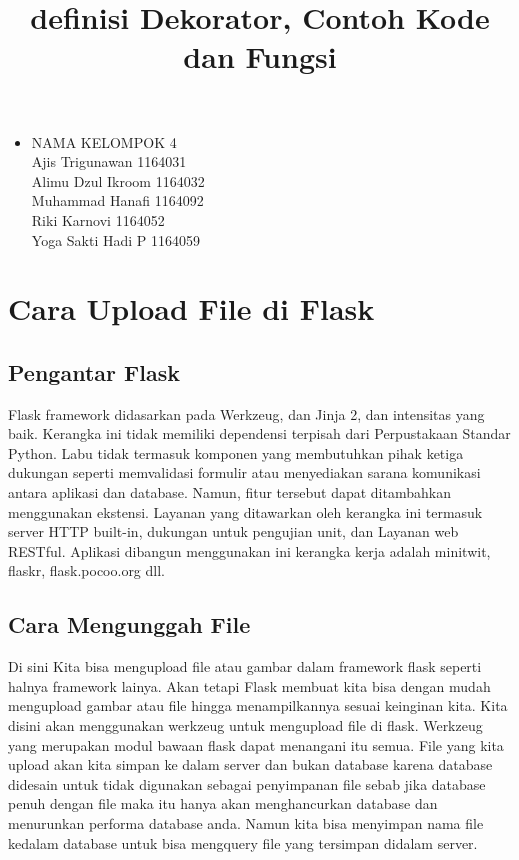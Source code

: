 \documentclass[12pt,a4paper]{article}
\begin{document}
\title{definisi Dekorator, Contoh Kode dan Fungsi}
\maketitle

\begin{itemize}

\item
NAMA KELOMPOK 4\\
Ajis Trigunawan			1164031\\
Alimu Dzul Ikroom		1164032\\
Muhammad Hanafi			1164092\\
Riki Karnovi			1164052\\
Yoga Sakti Hadi P		1164059\\

\end{itemize}

\section{Cara Upload File di Flask}

\subsection{Pengantar Flask}

Flask framework didasarkan pada Werkzeug, dan Jinja 2, dan intensitas yang baik. Kerangka ini tidak memiliki dependensi terpisah dari
Perpustakaan Standar Python. Labu tidak termasuk komponen yang membutuhkan pihak ketiga dukungan seperti memvalidasi formulir atau menyediakan sarana komunikasi antara aplikasi dan database. Namun, fitur tersebut dapat ditambahkan menggunakan ekstensi. Layanan yang ditawarkan oleh kerangka ini termasuk server HTTP built-in, dukungan untuk pengujian unit, dan Layanan web RESTful. Aplikasi dibangun menggunakan ini kerangka kerja adalah minitwit, flaskr, flask.pocoo.org dll.

\subsection{Cara Mengunggah File}


Di sini Kita bisa mengupload file atau gambar dalam framework flask seperti halnya framework lainya. Akan tetapi Flask membuat kita bisa dengan mudah mengupload gambar atau file hingga menampilkannya sesuai keinginan kita. Kita disini akan menggunakan werkzeug untuk mengupload file di flask. Werkzeug yang merupakan modul bawaan flask dapat menangani itu semua.
File yang kita upload akan kita simpan ke dalam server dan bukan database karena database didesain untuk tidak digunakan sebagai penyimpanan file sebab jika database penuh dengan file maka itu hanya akan menghancurkan database dan menurunkan performa database anda. Namun kita bisa menyimpan nama file kedalam database untuk bisa mengquery file yang tersimpan didalam server.
\end{document}
